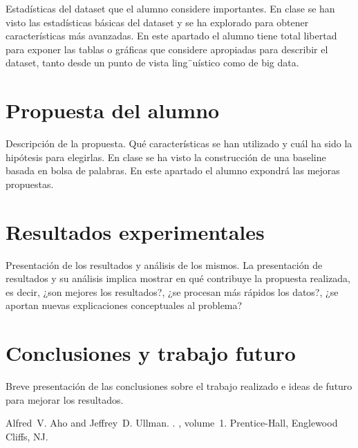 \documentclass[11pt,a4paper]{article}
\begin{document}
  
  Estad\'isticas del dataset que el alumno considere importantes. En clase se han visto las estad\'isticas b\'asicas del dataset y se ha explorado para obtener caracter\'isticas m\'as avanzadas. En este apartado el alumno tiene total libertad para exponer las tablas o gr\'aficas que considere apropiadas para describir el dataset, tanto desde un punto de vista ling¨u\'istico como de big data. 


\section{Propuesta del alumno}

Descripci\'on de la propuesta. Qu\'e caracter\'isticas se han utilizado y cu\'al ha sido la hip\'otesis para elegirlas. En clase se ha visto la construcci\'on de una baseline basada en bolsa de palabras. En este apartado el alumno expondr\'a las mejoras propuestas.

\section{Resultados experimentales}

Presentaci\'on de los resultados y an\'alisis de los mismos. La presentaci\'on de resultados y su an\'alisis implica mostrar en qu\'e contribuye la propuesta realizada, es decir, ¿son mejores los resultados?, ¿se procesan m\'as r\'apidos los datos?, ¿se aportan nuevas explicaciones conceptuales al problema?

\section{Conclusiones y trabajo futuro}

Breve presentaci\'on de las conclusiones sobre  el trabajo realizado e ideas de futuro para mejorar los resultados.


\begin{thebibliography}{}

Alfred~V. Aho and Jeffrey~D. Ullman.
.
, volume~1.
\newblock Prentice-{Hall}, Englewood Cliffs, NJ.

\end{thebibliography}
\end{document}
